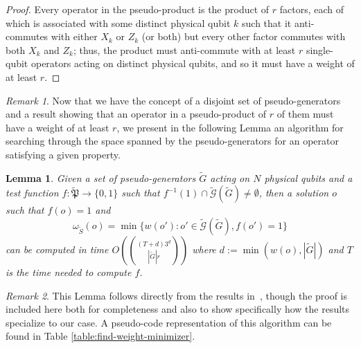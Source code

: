 \documentclass[12pt]{amsbook}
\theoremstyle{plain}
\newtheorem{lemma}{Lemma}
\theoremstyle{definition}
\theoremstyle{remark}
\newtheorem{remark}{Remark}
\newcommand{\set}{\tilde}
\newcommand{\genfun}{\tilde{\mathcal{G}}}
\newcommand{\pauligroup}{{\set{\mathfrak{P}}}}
\newcommand{\om}{\omega}
\newcommand{\paren}[1]{\left(#1\right)}
\begin{document}
\begin{proof}
Every operator in the pseudo-product is the product of $r$ factors, each of which is associated with some distinct physical qubit $k$ such that it anti-commutes with either $X_k$ or $Z_k$ (or both) but every other factor commutes with both $X_k$ and $Z_k$;  thus, the product must anti-commute with at least $r$ single-qubit operators acting on distinct physical qubits, and so it must have a weight of at least $r$.
\end{proof}
\begin{remark}
Now that we have the concept of a disjoint set of pseudo-generators and a result showing that an operator in a pseudo-product of $r$ of them must have a weight of at least $r$, we present in the following Lemma an algorithm for searching through the space spanned by the pseudo-generators for an operator satisfying a given property.
\end{remark}

\begin{lemma}
\label{lemma:minimal-weight-search}
Given a set of pseudo-generators $\set G$ acting on $N$ physical qubits and a test function $f:\pauligroup\to\{0,1\}$ such that $f^{-1}(1)\cap\genfun(\set G)\ne\emptyset$, then a solution $o$ such that $f(o)=1$ and $$\om_{\set S}(o)=\min\{w(o'):o'\in \genfun(\set G), f(o')=1\}$$ can be computed in time $O\paren{(T+d)3^d\choose{|\set G|}{r}}$ where $d:=\min\paren{w(o),|\set G|}$ and $T$ is the time needed to compute $f$.
\end{lemma}

\begin{remark}
This Lemma follows directly from the results in~\cite{White:2006fj}, though the proof is included here both for completeness and also to show specifically how the results specialize to our case.  A pseudo-code representation of this algorithm can be found in Table \ref{table:find-weight-minimizer}.
\end{remark}
\end{document}
